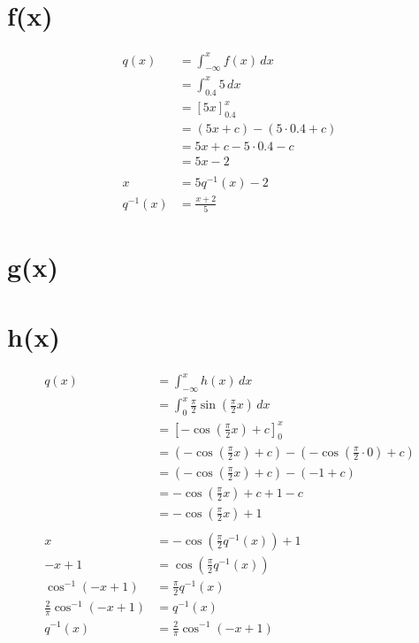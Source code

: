 \section{f(x)}

\begin{align}
q(x)
&= \int_{-\infty}^x f(x)\,dx \\
&= \int_{0.4}^x 5\,dx \\
&= \left[5x\right]_{0.4}^{x} \\
&= (5x + c) - (5 \cdot 0.4 + c) \\
&= 5x + c - 5 \cdot 0.4 - c \\
&= 5x - 2 \\
\\
x &= 5 q^{-1}(x) -2 \\
q^{-1}(x) &= \frac{x+2}{5}
\end{align}

\section{g(x)}


\section{h(x)}

\begin{align}
q(x)
&= \int_{-\infty}^x h(x)\,dx \\
&= \int_{0}^x \frac{\pi}{2} \sin\left(\frac{\pi}{2} x\right)\,dx \\
&= \left[-\cos\left(\frac{\pi}{2} x\right) + c\right]_0^x \\
&= \left(-\cos\left(\frac{\pi}{2} x\right) + c\right) - \left(-\cos\left(\frac{\pi}{2}\cdot 0\right) + c\right)\\
&= \left(-\cos\left(\frac{\pi}{2} x\right) + c\right) - \left(-1 + c\right)\\
&= -\cos\left(\frac{\pi}{2} x\right) + c + 1 - c\\
&= -\cos\left(\frac{\pi}{2} x\right) + 1\\
\\
x &= -\cos\left(\frac{\pi}{2} q^{-1}(x)\right) + 1\\
-x + 1 &= \cos\left(\frac{\pi}{2} q^{-1}(x)\right) \\
\cos^{-1}(-x + 1) &= \frac{\pi}{2} q^{-1}(x) \\
\frac{2}{\pi} \cos^{-1}(-x + 1) &= q^{-1}(x) \\
q^{-1}(x) &= \frac{2}{\pi} \cos^{-1}(-x + 1) \\
\end{align}